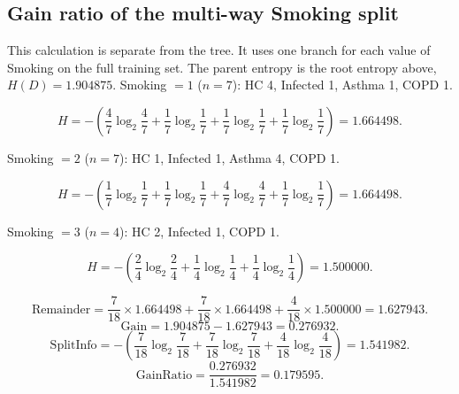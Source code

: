 \subsection*{Gain ratio of the multi-way Smoking split}

This calculation is separate from the tree. It uses one branch for each value of Smoking on the full training set.
The parent entropy is the root entropy above, $H(D)=1.904875$.
Smoking $= 1$ ($n=7$): HC 4, Infected 1, Asthma 1, COPD 1.

\[ H = -\left(\frac{4}{7}\log_2\frac{4}{7}+\frac{1}{7}\log_2\frac{1}{7}+\frac{1}{7}\log_2\frac{1}{7}+\frac{1}{7}\log_2\frac{1}{7}\right) = 1.664498. \]

Smoking $= 2$ ($n=7$): HC 1, Infected 1, Asthma 4, COPD 1.

\[ H = -\left(\frac{1}{7}\log_2\frac{1}{7}+\frac{1}{7}\log_2\frac{1}{7}+\frac{4}{7}\log_2\frac{4}{7}+\frac{1}{7}\log_2\frac{1}{7}\right) = 1.664498. \]

Smoking $= 3$ ($n=4$): HC 2, Infected 1, COPD 1.

\[ H = -\left(\frac{2}{4}\log_2\frac{2}{4}+\frac{1}{4}\log_2\frac{1}{4}+\frac{1}{4}\log_2\frac{1}{4}\right) = 1.500000. \]

\[ \mathrm{Remainder} = \frac{7}{18}\times 1.664498 + \frac{7}{18}\times 1.664498 + \frac{4}{18}\times 1.500000 = 1.627943. \]
\[ \mathrm{Gain} = 1.904875 - 1.627943 = 0.276932. \]
\[ \mathrm{SplitInfo} = -\left(\frac{7}{18}\log_2\frac{7}{18}+\frac{7}{18}\log_2\frac{7}{18}+\frac{4}{18}\log_2\frac{4}{18}\right) = 1.541982. \]
\[ \mathrm{GainRatio} = \frac{0.276932}{1.541982} = 0.179595. \]
